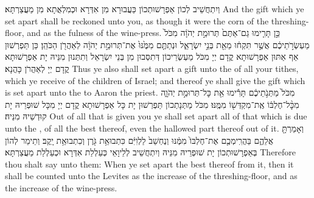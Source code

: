 {וְיִתְחֲשֵׁיב לְכוֹן אַפְרָשׁוּתְכוֹן כַּעֲבוּרָא מִן אִדְּרָא וּכְמִלְאֲתָא מִן מַעֲצַרְתָּא׃}
{And the gift which ye set apart shall be reckoned unto you, as though it were the corn of the threshing-floor, and as the fulness of the wine-press.}{}
{כֵּ֣ן תָּרִ֤ימוּ גַם־אַתֶּם֙ תְּרוּמַ֣ת יְהֹוָ֔ה מִכֹּל֙ מַעְשְׂרֹ֣תֵיכֶ֔ם אֲשֶׁ֣ר תִּקְח֔וּ מֵאֵ֖ת בְּנֵ֣י יִשְׂרָאֵ֑ל וּנְתַתֶּ֤ם מִמֶּ֙נּוּ֙ אֶת־תְּרוּמַ֣ת יְהֹוָ֔ה לְאַהֲרֹ֖ן הַכֹּהֵֽן׃
}
{כֵּן תַּפְרְשׁוּן אַף אַתּוּן אַפְרָשׁוּתָא קֳדָם יְיָ מִכֹּל מַעְשְׂרֵיכוֹן דְּתִסְּבוּן מִן בְּנֵי יִשְׂרָאֵל וְתִתְּנוּן מִנֵּיהּ יָת אַפְרָשׁוּתָא קֳדָם יְיָ לְאַהֲרֹן כָּהֲנָא׃}
{Thus ye also shall set apart a gift unto the \lord\space of all your tithes, which ye receive of the children of Israel; and thereof ye shall give the gift which is set apart unto the \lord\space to Aaron the priest.}{}
{מִכֹּל֙ מַתְּנֹ֣תֵיכֶ֔ם תָּרִ֕ימוּ אֵ֖ת כׇּל־תְּרוּמַ֣ת יְהֹוָ֑ה מִכׇּ֨ל־חֶלְבּ֔וֹ אֶֽת־מִקְדְּשׁ֖וֹ מִמֶּֽנּוּ׃
}
{מִכֹּל מַתְּנָתְכוֹן תַּפְרְשׁוּן יָת כָּל אַפְרָשׁוּתָא קֳדָם יְיָ מִכָּל שׁוּפְרֵיהּ יָת קוּדְשֵׁיהּ מִנֵּיהּ׃}
{Out of all that is given you ye shall set apart all of that which is due unto the \lord, of all the best thereof, even the hallowed part thereof out of it.}{}
{וְאָמַרְתָּ֖ אֲלֵהֶ֑ם בַּהֲרִֽימְכֶ֤ם אֶת־חֶלְבּוֹ֙ מִמֶּ֔נּוּ וְנֶחְשַׁב֙ לַלְוִיִּ֔ם כִּתְבוּאַ֥ת גֹּ֖רֶן וְכִתְבוּאַ֥ת יָֽקֶב׃
}
{וְתֵימַר לְהוֹן בְּאַפְרָשׁוּתְכוֹן יָת שׁוּפְרֵיהּ מִנֵּיהּ וְיִתְחֲשֵׁיב לְלֵיוָאֵי כְּעַלְלַת אִדְּרָא וּכְעַלְלַת מַעֲצַרְתָּא׃}
{Therefore thou shalt say unto them: When ye set apart the best thereof from it, then it shall be counted unto the Levites as the increase of the threshing-floor, and as the increase of the wine-press.}{}
